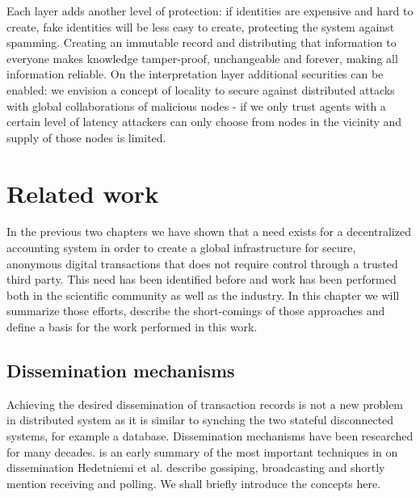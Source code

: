 
Each layer adds another level of protection: if identities are expensive and hard to create, fake 
identities will be less easy to create, protecting the system against spamming. Creating an immutable
record and distributing that information to everyone makes knowledge tamper-proof, unchangeable and 
forever, making all information reliable. On the interpretation layer additional securities can be 
enabled: we envision a concept of locality to secure against distributed attacks with global 
collaborations of malicious nodes - if we only trust agents with a certain level of latency 
attackers can only choose from nodes in the vicinity and supply of those nodes is limited. 

\section{Related work}
In the previous two chapters we have shown that a need exists for a decentralized accounting system 
in order to create a global infrastructure for secure, anonymous digital transactions that does not 
require control through a trusted third party. This need has been identified before and work has 
been performed both in the scientific community as well as the industry. In this chapter we will 
summarize those efforts, describe the short-comings of those approaches and define a basis for the 
work performed in this work.

\subsection{Dissemination mechanisms}
Achieving the desired dissemination of transaction records is not a new problem in distributed 
system as it is similar to synching the two stateful disconnected systems, for example a database.
Dissemination mechanisms have been researched for many decades. \cite{hedetniemi1988survey} is an 
early summary of the most important techniques in on dissemination Hedetniemi et al. describe 
gossiping, broadcasting and shortly mention receiving and polling. We shall briefly introduce the 
concepts here.

